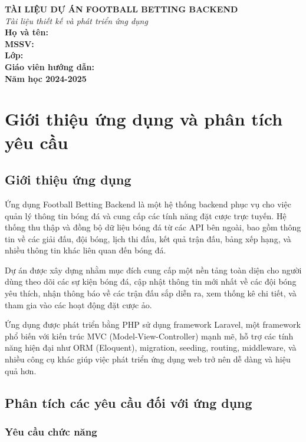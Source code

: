 \documentclass[a4paper,12pt]{report}
\begin{document}
\begin{titlepage}
\centering
{\Huge\textbf{TÀI LIỆU DỰ ÁN FOOTBALL BETTING BACKEND}}\\[2cm]
{\large\textit{Tài liệu thiết kế và phát triển ứng dụng}}\\[6cm]
{\large\textbf{Họ và tên:}} \\
{\large\textbf{MSSV:}} \\[1cm]
{\large\textbf{Lớp:}} \\[1cm]
{\large\textbf{Giáo viên hướng dẫn:}} \\[5cm]
{\large\textbf{Năm học 2024-2025}}
\end{titlepage}

\tableofcontents
\newpage

\chapter{Giới thiệu ứng dụng và phân tích yêu cầu}

\section{Giới thiệu ứng dụng}

Ứng dụng Football Betting Backend là một hệ thống backend phục vụ cho việc quản lý thông tin bóng đá và cung cấp các tính năng đặt cược trực tuyến. Hệ thống thu thập và đồng bộ dữ liệu bóng đá từ các API bên ngoài, bao gồm thông tin về các giải đấu, đội bóng, lịch thi đấu, kết quả trận đấu, bảng xếp hạng, và nhiều thông tin khác liên quan đến bóng đá.

Dự án được xây dựng nhằm mục đích cung cấp một nền tảng toàn diện cho người dùng theo dõi các sự kiện bóng đá, cập nhật thông tin mới nhất về các đội bóng yêu thích, nhận thông báo về các trận đấu sắp diễn ra, xem thống kê chi tiết, và tham gia vào các hoạt động đặt cược ảo.

Ứng dụng được phát triển bằng PHP sử dụng framework Laravel, một framework phổ biến với kiến trúc MVC (Model-View-Controller) mạnh mẽ, hỗ trợ các tính năng hiện đại như ORM (Eloquent), migration, seeding, routing, middleware, và nhiều công cụ khác giúp việc phát triển ứng dụng web trở nên dễ dàng và hiệu quả hơn.

\section{Phân tích các yêu cầu đối với ứng dụng}

\subsection{Yêu cầu chức năng}
\end{document}
